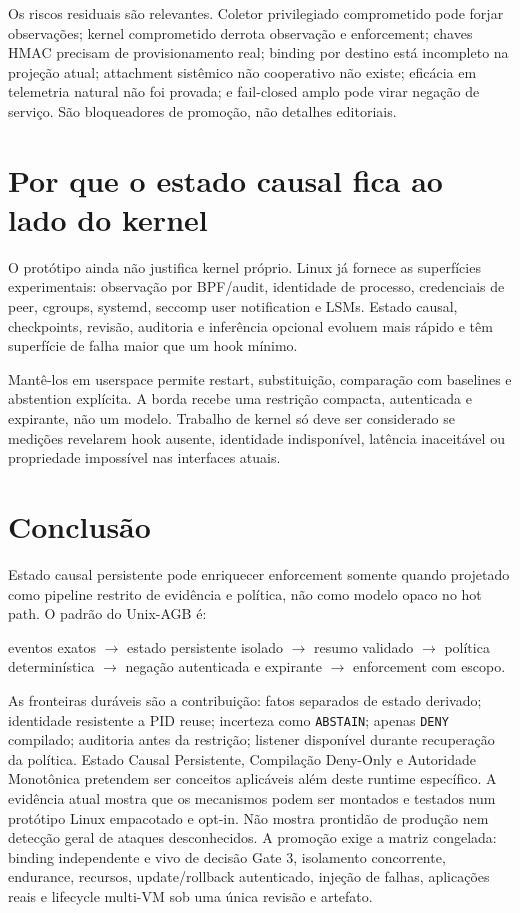 \documentclass[11pt,a4paper]{article}
\begin{document}
Os riscos residuais são relevantes. Coletor privilegiado comprometido pode
forjar observações; kernel comprometido derrota observação e enforcement;
chaves HMAC precisam de provisionamento real; binding por destino está
incompleto na projeção atual; attachment sistêmico não cooperativo não existe;
eficácia em telemetria natural não foi provada; e fail-closed amplo pode virar
negação de serviço. São bloqueadores de promoção, não detalhes editoriais.

\section{Por que o estado causal fica ao lado do kernel}

O protótipo ainda não justifica kernel próprio. Linux já fornece as superfícies
experimentais: observação por BPF/audit, identidade de processo, credenciais de
peer, cgroups, systemd, seccomp user notification e LSMs. Estado causal,
checkpoints, revisão, auditoria e inferência opcional evoluem mais rápido e têm
superfície de falha maior que um hook mínimo.

Mantê-los em userspace permite restart, substituição, comparação com baselines e
abstention explícita. A borda recebe uma restrição compacta, autenticada e
expirante, não um modelo. Trabalho de kernel só deve ser considerado se medições
revelarem hook ausente, identidade indisponível, latência inaceitável ou
propriedade impossível nas interfaces atuais.

\section{Conclusão}

Estado causal persistente pode enriquecer enforcement somente quando projetado
como pipeline restrito de evidência e política, não como modelo opaco no hot
path. O padrão do Unix-AGB é:

\begin{center}
eventos exatos $\rightarrow$ estado persistente isolado $\rightarrow$ resumo
validado $\rightarrow$ política determinística $\rightarrow$ negação autenticada
e expirante $\rightarrow$ enforcement com escopo.
\end{center}

As fronteiras duráveis são a contribuição: fatos separados de estado derivado;
identidade resistente a PID reuse; incerteza como \texttt{ABSTAIN}; apenas
\texttt{DENY} compilado; auditoria antes da restrição; listener disponível
durante recuperação da política. Estado Causal Persistente, Compilação Deny-Only
e Autoridade Monotônica pretendem ser conceitos aplicáveis além deste runtime
específico. A evidência atual mostra que os mecanismos podem ser montados e
testados num protótipo Linux empacotado e opt-in. Não mostra
prontidão de produção nem detecção geral de ataques desconhecidos. A promoção
exige a matriz congelada: binding independente e vivo de decisão Gate 3,
isolamento concorrente, endurance, recursos, update/rollback autenticado,
injeção de falhas, aplicações reais e lifecycle multi-VM sob uma única revisão
e artefato.
\end{document}
